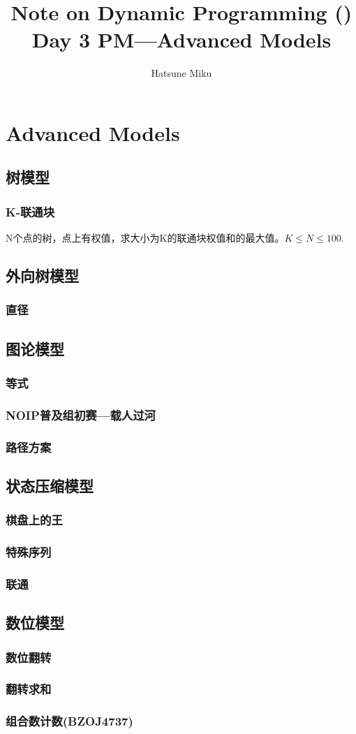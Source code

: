 \documentclass{article}
\newcommand{\romannum}[1]{\uppercase\expandafter{\romannumeral#1}}
\begin{document}
\title{Note on Dynamic Programming (\romannum{3})\\\large{Day 3 PM---Advanced Models}}\date{}\author{Hatsune Miku}
\maketitle
\section{Advanced Models}
\subsection{树模型}
\subsubsection{K-联通块}
N个点的树，点上有权值，求大小为K的联通块权值和的最大值。$K\le N\le 100.$


\subsection{外向树模型}
\subsubsection{直径}
\subsection{图论模型}
\subsubsection{等式}
\subsubsection{NOIP普及组初赛---载人过河}
\subsubsection{路径方案}
\subsection{状态压缩模型}
\subsubsection{棋盘上的王}
\subsubsection{特殊序列}
\subsubsection{联通}
\subsection{数位模型}
\subsubsection{数位翻转}
\subsubsection{翻转求和}
\subsubsection{组合数计数(BZOJ4737)}
\end{document}
